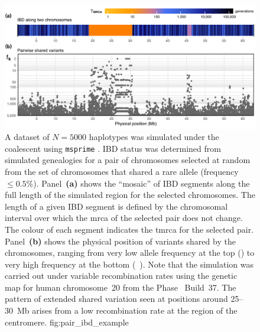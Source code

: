 

\begin{figure}[!htb]
\centering
\includegraphics[width=\textwidth]{./img/ch3/pair_ibd_example}
{A dataset of ${N=\num{5000}}$ haplotypes was simulated under the coalescent using \texttt{msprime} \citep{Kelleher:2016fn}.
IBD status was determined from simulated genealogies for a pair of chromosomes selected at random from the set of chromosomes that shared a rare allele (frequency $\leq 0.5\%$).
Panel~\textbf{(a)} shows the ``mosaic'' of IBD segments along the full length of the simulated region for the  selected chromosomes.
The length of a given IBD segment is defined by the chromosomal interval over which the \gls{mrca} of the selected pair does not change.
The colour of each segment indicates the \gls{tmrca} for the selected pair.
Panel~\textbf{(b)} shows the physical position of \fk{} variants shared by the  chromosomes, ranging from very low allele frequency at the top () to very high frequency at the bottom (\eg~).
Note that the simulation was carried out under variable recombination rates using the genetic map for human chromosome~20 from the  Phase~ Build~37.
The pattern of extended shared variation seen at positions around 25--30~\gls{Mb} arises from a low recombination rate at the region of the centromere.}
{fig:pair_ibd_example}
\end{figure}

\glslocalresetall
